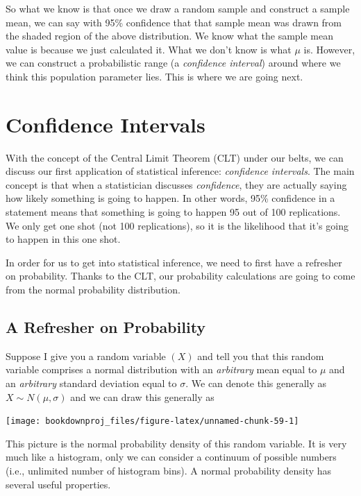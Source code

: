 \documentclass[
]{book}
\begin{document}
So what we know is that once we draw a random sample and construct a sample mean, we can say with 95\% confidence that that sample mean was drawn from the shaded region of the above distribution. We know what the sample mean value is because we just calculated it. What we don't know is what \(\mu\) is. However, we can construct a probabilistic range (a \emph{confidence interval}) around where we think this population parameter lies. This is where we are going next.

\chapter{Confidence Intervals}\label{CI}

With the concept of the Central Limit Theorem (CLT) under our belts, we can discuss our first application of statistical inference: \emph{confidence intervals}. The main concept is that when a statistician discusses \emph{confidence}, they are actually saying how likely something is going to happen. In other words, 95\% confidence in a statement means that something is going to happen 95 out of 100 replications. We only get one shot (not 100 replications), so it is the likelihood that it's going to happen in this one shot.

In order for us to get into statistical inference, we need to first have a refresher on probability. Thanks to the CLT, our probability calculations are going to come from the normal probability distribution.

\section{A Refresher on Probability}\label{a-refresher-on-probability}

Suppose I give you a random variable \((X)\) and tell you that this random variable comprises a normal distribution with an \emph{arbitrary} mean equal to \(\mu\) and an \emph{arbitrary} standard deviation equal to \(\sigma\). We can denote this generally as \(X \sim N(\mu,\sigma)\) and we can draw this generally as

\begin{center}\texttt{[image: bookdownproj\_files/figure-latex/unnamed-chunk-59-1]} \end{center}

This picture is the normal probability density of this random variable. It is very much like a histogram, only we can consider a continuum of possible numbers (i.e., unlimited number of histogram bins). A normal probability density has several useful properties.
\end{document}
